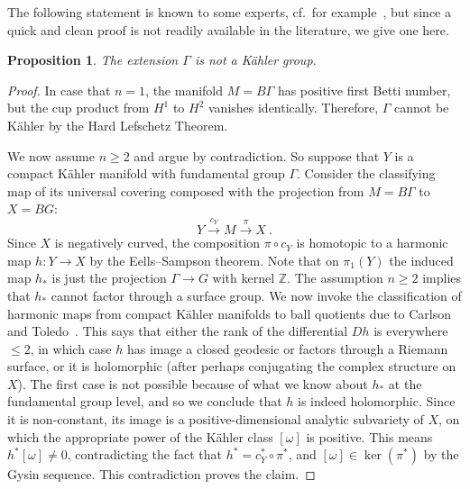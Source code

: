 \documentclass[12pt,leqno]{amsart}
\newcommand{\Z}{\mathbb{Z}}
\newtheorem{prop}[theor]{Proposition}
\begin{document}
The following statement is known to some experts, cf.~for example~\cite{Rez}, 
but since a quick and clean proof is not readily available in the literature, we give one here.

\begin{prop}\label{GammanotKaehler}
The extension $\Gamma$ is not a K\"ahler group.
\end{prop}
\begin{proof}
In case that $n=1$, the manifold $M=B\Gamma$ has positive first Betti number,
but the cup product from $H^1$ to $H^2$ vanishes identically. Therefore, $\Gamma$
cannot be K\"ahler by the Hard Lefschetz Theorem.

We now assume $n\geq 2$ and argue by contradiction. So suppose that $Y$ is 
a compact K\"ahler manifold with fundamental group $\Gamma$. Consider the 
classifying map of its universal covering composed with the projection from $M=B\Gamma$
to $X=BG$:
$$
Y \stackrel{c_Y}{\longrightarrow} M  \stackrel{\pi}{\longrightarrow} X \ .
$$
Since $X$ is negatively curved, the composition $\pi\circ c_Y$ is homotopic
to a harmonic map $h\colon Y \longrightarrow X$ by the Eells--Sampson theorem.
Note that on $\pi_1(Y)$ the induced map $h_*$ is just the projection $\Gamma\longrightarrow G$
with kernel $\Z$. The assumption $n\geq 2$ implies that $h_*$ cannot factor through a 
surface group. We now invoke the classification of harmonic maps from compact 
K\"ahler manifolds to ball quotients due to Carlson and Toledo~\cite[Theorem~7.2]{CT}.
This says that either the rank of the differential $Dh$ is everywhere $\leq 2$, in which 
case $h$ has image a closed geodesic or factors through a Riemann surface, or it 
is holomorphic (after perhaps conjugating the complex structure on $X$). The first 
case is not possible because of what we know about $h_*$ at the fundamental group 
level, and so we conclude that $h$ is indeed holomorphic. Since it is non-constant,
its image is a positive-dimensional analytic subvariety of $X$, on which the appropriate 
power of the K\"ahler class $[\omega ]$ is positive. This means $h^*[\omega]\neq 0$,
contradicting the fact that $h^* = c_Y^*\circ\pi^*$, and $[\omega]\in \ker (\pi^* )$
by the Gysin sequence. This contradiction proves the claim.
\end{proof}
\end{document}
